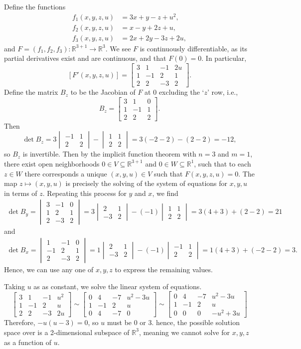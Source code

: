 \documentclass[12pt]{article}
\theoremstyle{definition}
\newcommand{\R}{\mathbb{R}}
\newcommand{\mat}[1]{\begin{bmatrix}#1\end{bmatrix}}
\newcommand{\mdet}[1]{\begin{vmatrix}#1\end{vmatrix}}
\begin{document}
Define the functions
\begin{align*}
    f_1(x, y, z, u) &= 3x + y - z + u^2, \\
    f_2(x, y, z, u) &= x - y + 2z + u, \\
    f_3(x, y, z, u) &= 2x + 2y - 3z + 2u,
\end{align*}
and $F = (f_1, f_2, f_3) : \R^{3 + 1} \to \R^3$. We see $F$ is continuously differentiable, as its partial derivatives exist and are continuous, and that $F(0) = 0$. In particular,
\[
    [F'(x, y, z, u)] = \mat{3 & 1 & -1 & 2u \\ 1 & -1 & 2 & 1 \\ 2 & 2 & -3 & 2}.
\]
Define the matrix $B_z$ to be the Jacobian of $F$ at $0$ excluding the `$z$' row, i.e.,
\[
    B_z = \mat{3 & 1 & 0 \\ 1 & -1 & 1 \\ 2 & 2 & 2}.
\]
Then
\[
    \det B_z 
        = 3\mdet{-1 & 1 \\ 2 & 2} - \mdet{1 & 1 \\ 2 & 2}
        = 3(-2 - 2) - (2 - 2)
        = -12,
\]
so $B_z$ is invertible. Then by the implicit function theorem with $n = 3$ and $m = 1$, there exist open neighborhoods $0 \in V \subseteq \R^{3+1}$ and $0 \in W \subseteq \R^1$, such that to each $z \in W$ there corresponds a unique $(x, y, u) \in V$ such that $F(x, y, z, u) = 0$. The map $z \mapsto (x, y, u)$ is precisely the solving of the system of equations for $x, y, u$ in terms of $z$. Repeating this process for $y$ and $x$, we find
\begin{align*}
    \det B_y = \mdet{3 & -1 & 0 \\ 1 & 2 & 1 \\ 2 & -3 & 2} = 3\mdet{2 & 1 \\ -3 & 2} - (-1)\mdet{1 & 1 \\ 2 & 2} 
        = 3(4 + 3) + (2 - 2) 
        = 21
\end{align*}
and
\begin{align*}
    \det B_x = \mdet{1 & -1 & 0 \\ -1 & 2 & 1 \\ 2 & -3 & 2} = 1\mdet{2 & 1 \\ -3 & 2} - (-1)\mdet{-1 & 1 \\ 2 & 2} 
        = 1(4 + 3) + (-2 - 2) 
        = 3.
\end{align*}
Hence, we can use any one of $x, y, z$ to express the remaining values.

Taking $u$ as as constant, we solve the linear system of equations.
\[
    \mat{3 & 1 & -1 & u^2 \\ 1 & -1 & 2 & u \\ 2 & 2 & -3 & 2u}
        \sim \mat{0 & 4 & -7 & u^2 - 3u \\ 1 & -1 & 2 & u \\ 0 & 4 & -7 & 0}
        \sim \mat{0 & 4 & -7 & u^2 - 3u \\ 1 & -1 & 2 & u \\ 0 & 0 & 0 & -u^2 + 3u}
\]
Therefore, $-u(u - 3) = 0$, so $u$ must be $0$ or $3$. hence, the possible solution space over is a 2-dimensional subspace of $\R^3$, meaning we cannot solve for $x, y, z$ as a function of $u$.
\end{document}

